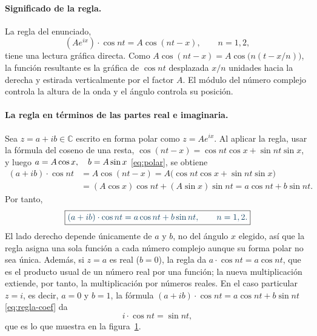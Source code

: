 \paragraph{Significado de la regla.}
La regla del enunciado,
\[
  (Ae^{ix})\cdot\cos nt = A\cos(nt-x),\qquad n=1,2,
\]
tiene una lectura gráfica directa. Como $A\cos(nt-x)=A\cos\bigl(n(t-x/n)\bigr)$, la función
resultante es la gráfica de $\cos nt$ desplazada $x/n$ unidades hacia la derecha y estirada
verticalmente por el factor $A$. El módulo del número complejo controla la altura de la onda y
el ángulo controla su posición.

\paragraph{La regla en términos de las partes real e imaginaria.}
Sea $z=a+ib\in\mathbb C$ escrito en forma polar como $z=Ae^{ix}$. Al aplicar la regla, usar la
fórmula del coseno de una resta, $\cos(nt-x)=\cos nt\cos x+\sin nt\sin x$, y luego
$a=A\cos x,\quad\penalty0 b=A\sin x$ \eqref{eq:polar}, se obtiene
\begin{align*}
  (a+ib)\cdot\cos nt
  &=A\cos(nt-x)
   =A\bigl(\cos nt\cos x+\sin nt\sin x\bigr)\\
  &=(A\cos x)\cos nt+(A\sin x)\sin nt
   =a\cos nt+b\sin nt .
\end{align*}
Por tanto,
\begin{equation}\label{eq:regla-coef}
  \destacado{(a+ib)\cdot\cos nt=a\cos nt+b\sin nt,\qquad n=1,2.}
\end{equation}
El lado derecho depende únicamente de $a$ y $b$, no del ángulo $x$ elegido, así que la regla
asigna una sola función a cada número complejo aunque su forma polar no sea única. Además, si
$z=a$ es real ($b=0$), la regla da $a\cdot\cos nt=a\cos nt$, que es el producto usual de un
número real por una función; la nueva multiplicación extiende, por tanto, la multiplicación
por números reales. En el caso particular $z=i$, es decir, $a=0$ y $b=1$, la fórmula
$(a+ib)\cdot\cos nt=a\cos nt+b\sin nt$ \eqref{eq:regla-coef} da
\begin{equation}\label{eq:i-cos}
  i\cdot\cos nt=\sin nt ,
\end{equation}
que es lo que muestra en la figura~\ref{fig:regla}.

\begin{figure}[H]
\centering
{}
\caption{}
\label{fig:regla}
\end{figure}

